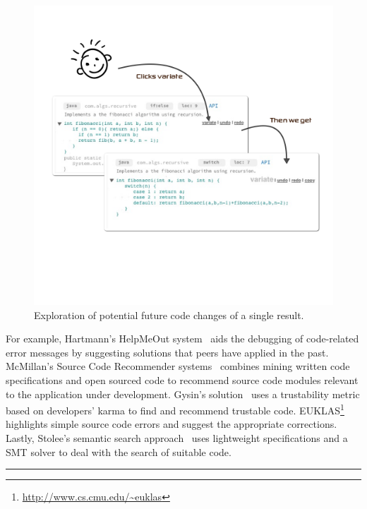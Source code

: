 \begin{figure}[!ht]
    \centering
    \includegraphics[width=\textwidth]{images/basealternative}
    \caption{Exploration of potential future code changes of a single result.}
    \label{fig:basealternative}
\end{figure}

For example, Hartmann's HelpMeOut system~\cite{Hartmann:2010hx} aids the debugging of code-related error messages by suggesting solutions that peers have applied in the past. McMillan's Source Code Recommender systems~\cite{McMillan:2012dj} combines mining written code specifications and open sourced code to recommend source code modules relevant to the application under development. Gysin's solution~\cite{Gysin:2010kt} uses a trustability metric based on developers' karma to find and recommend trustable code. EUKLAS\footnote{\url{http://www.cs.cmu.edu/~euklas}} highlights simple source code errors and suggest the appropriate corrections. Lastly, Stolee's semantic search approach~\cite{Stolee:2012wp} uses lightweight specifications and a SMT solver to deal with the search of suitable code.  


\fancybreak{\pfbreakdisplay}

